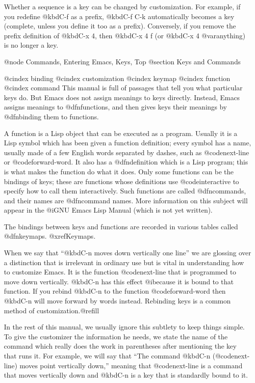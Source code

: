{{  Whether a sequence is a key can be changed by customization.  For
example, if you redefine @kbd{C-f} as a prefix, @kbd{C-f C-k} automatically
becomes a key (complete, unless you define it too as a prefix).
Conversely, if you remove the prefix definition of @kbd{C-x 4}, then
@kbd{C-x 4 f} (or @kbd{C-x 4 @var{anything}}) is no longer a key.

@node Commands, Entering Emacs, Keys, Top
@section Keys and Commands

@cindex binding
@cindex customization
@cindex keymap
@cindex function
@cindex command
  This manual is full of passages that tell you what particular keys do.
But Emacs does not assign meanings to keys directly.  Instead, Emacs
assigns meanings to @dfn{functions}, and then gives keys their meanings by
@dfn{binding} them to functions.

  A function is a Lisp object that can be executed as a program.  Usually
it is a Lisp symbol which has been given a function definition; every
symbol has a name, usually made of a few English words separated by dashes,
such as @code{next-line} or @code{forward-word}.  It also has a
@dfn{definition} which is a Lisp program; this is what makes the function
do what it does.  Only some functions can be the bindings of keys; these
are functions whose definitions use @code{interactive} to specify how to
call them interactively.  Such functions are called @dfn{commands}, and
their names are @dfn{command names}.  More information on this subject will
appear in the @i{GNU Emacs Lisp Manual} (which is not yet written).

  The bindings between keys and functions are recorded in various tables
called @dfn{keymaps}.  @xref{Keymaps}.

  When we say that ``@kbd{C-n} moves down vertically one line'' we are
glossing over a distinction that is irrelevant in ordinary use but is vital
in understanding how to customize Emacs.  It is the function
@code{next-line} that is programmed to move down vertically.  @kbd{C-n} has
this effect @i{because} it is bound to that function.  If you rebind
@kbd{C-n} to the function @code{forward-word} then @kbd{C-n} will move
forward by words instead.  Rebinding keys is a common method of
customization.@refill

  In the rest of this manual, we usually ignore this subtlety to keep
things simple.  To give the customizer the information he needs, we
state the name of the command which really does the work in parentheses
after mentioning the key that runs it.  For example, we will say that
``The command @kbd{C-n} (@code{next-line}) moves point vertically down,''
meaning that @code{next-line} is a command that moves vertically down
and @kbd{C-n} is a key that is standardly bound to it.

}}

